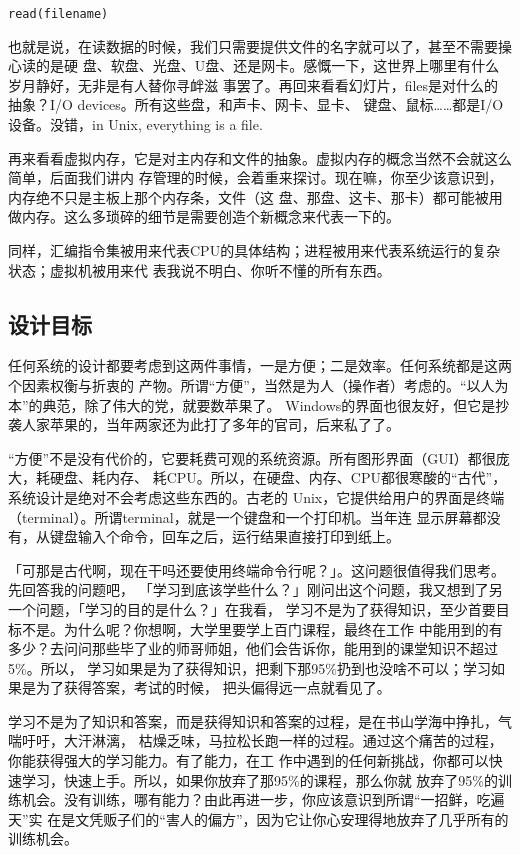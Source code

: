 \documentclass{wx672ctexart}
\newcommand\mpic[1]{%
  \marginpar{\texttt{[image: thumbnails/\#1]}}}
\begin{document}
\begin{verbatim}
read(filename)
\end{verbatim}

也就是说，在读数据的时候，我们只需要提供文件的名字就可以了，甚至不需要操心读的是硬
盘、软盘、光盘、U盘、还是网卡。感慨一下，这世界上哪里有什么岁月静好，无非是有人替你寻衅滋
事罢了。再回来看看幻灯片，files是对什么的抽象？I/O devices。所有这些盘，和声卡、网卡、显卡、
键盘、鼠标……都是I/O设备。没错，in Unix, everything is a file.

再来看看虚拟内存，它是对主内存和文件的抽象。虚拟内存的概念当然不会就这么简单，后面我们讲内
存管理的时候，会着重来探讨。现在嘛，你至少该意识到，内存绝不只是主板上那个内存条，文件（这
盘、那盘、这卡、那卡）都可能被用做内存。这么多琐碎的细节是需要创造个新概念来代表一下的。

同样，汇编指令集被用来代表CPU的具体结构；进程被用来代表系统运行的复杂状态；虚拟机被用来代
表我说不明白、你听不懂的所有东西。
\subsection{设计目标}
\label{sec:org587643a}
\mpic{pg_0011}
任何系统的设计都要考虑到这两件事情，一是方便；二是效率。任何系统都是这两个因素权衡与折衷的
产物。所谓“方便”，当然是为人（操作者）考虑的。“以人为本”的典范，除了伟大的党，就要数苹果了。
Windows的界面也很友好，但它是抄袭人家苹果的，当年两家还为此打了多年的官司，后来私了了。

“方便”不是没有代价的，它要耗费可观的系统资源。所有图形界面（GUI）都很庞大，耗硬盘、耗内存、
耗CPU。所以，在硬盘、内存、CPU都很寒酸的“古代”，系统设计是绝对不会考虑这些东西的。古老的
Unix，它提供给用户的界面是终端（terminal）。所谓terminal，就是一个键盘和一个打印机。当年连
显示屏幕都没有，从键盘输入个命令，回车之后，运行结果直接打印到纸上。

「可那是古代啊，现在干吗还要使用终端命令行呢？」。这问题很值得我们思考。先回答我的问题吧，
「学习到底该学些什么？」刚问出这个问题，我又想到了另一个问题，「学习的目的是什么？」在我看，
学习不是为了获得知识，至少首要目标不是。为什么呢？你想啊，大学里要学上百门课程，最终在工作
中能用到的有多少？去问问那些毕了业的师哥师姐，他们会告诉你，能用到的课堂知识不超过5\%。所以，
学习如果是为了获得知识，把剩下那95\%扔到也没啥不可以；学习如果是为了获得答案，考试的时候，
把头偏得远一点就看见了。

学习不是为了知识和答案，而是获得知识和答案的过程，是在书山学海中挣扎，气喘吁吁，大汗淋漓，
枯燥乏味，马拉松长跑一样的过程。通过这个痛苦的过程，你能获得强大的学习能力。有了能力，在工
作中遇到的任何新挑战，你都可以快速学习，快速上手。所以，如果你放弃了那95\%的课程，那么你就
放弃了95\%的训练机会。没有训练，哪有能力？由此再进一步，你应该意识到所谓“一招鲜，吃遍天”实
在是文凭贩子们的“害人的偏方”，因为它让你心安理得地放弃了几乎所有的训练机会。
\end{document}

